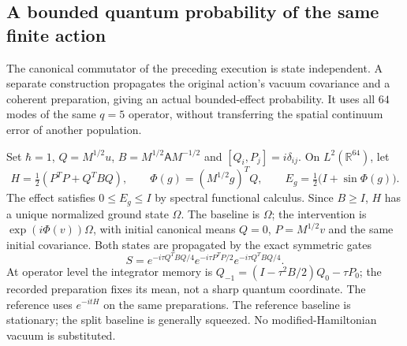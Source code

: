 \subsection{A bounded quantum probability of the same finite action}
\label{sec:source-scalar-quantum}

The canonical commutator of the preceding execution is state independent.
A separate construction propagates the original action's vacuum covariance
and a coherent preparation, giving an actual bounded-effect probability.
It uses all $64$ modes of the same $q=5$ operator, without transferring the
spatial continuum error of another population.

Set $\hbar=1$, $Q=M^{1/2}u$, $B=M^{1/2}\mathsf A M^{-1/2}$ and
$[Q_i,P_j]=i\delta_{ij}$. On $L^2(\mathbb R^{64})$, let
\[
 H=\tfrac12(P^TP+Q^TBQ),\qquad
 \Phi(g)=(M^{1/2}g)^TQ,\qquad
 E_g=\tfrac12\bigl(I+\sin\Phi(g)\bigr).
\]
The effect satisfies $0\le E_g\le I$ by spectral functional calculus.
Since $B\ge I$, $H$ has a unique normalized ground state $\Omega$.
The baseline is $\Omega$; the intervention is
$\exp(i\Phi(v))\Omega$, with initial canonical means
$Q=0$, $P=M^{1/2}v$ and the same initial covariance.
Both states are propagated by the exact symmetric gates
\[
 S=e^{-i\tau Q^TBQ/4}e^{-i\tau P^TP/2}e^{-i\tau Q^TBQ/4}.
\]
At operator level the integrator memory is
$Q_{-1}=(I-\tau^2B/2)Q_0-\tau P_0$; the recorded preparation
fixes its mean, not a sharp quantum coordinate.
The reference uses $e^{-itH}$ on the same preparations.
The reference baseline is stationary; the split baseline is generally
squeezed. No modified-Hamiltonian vacuum is substituted.

